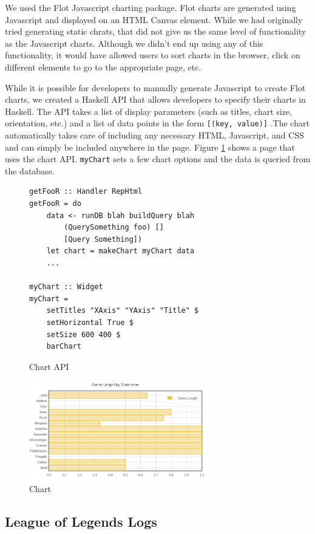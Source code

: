 \documentclass[letterpaper,twocolumn,9pt]{article}
\newcommand{\code}[1]{\texttt{#1}}
\begin{document}
We used the Flot Javascript charting package. Flot charts are generated using Javascript and displayed on an HTML Canvas element. While we had originally tried generating static chrats, that did not give us the same level of functionality as the Javascript charts. Although we didn't end up using any of this functionality, it would have allowed users to sort charts in the browser, click on different elements to go to the appropriate page, etc. 

While it is possible for developers to manually generate Javascript to create Flot charts, we created a Haskell API that allows developers to specify their charts in Haskell. The API takes a list of display parameters (such as titles, chart size, orientation, etc.) and a list of data points in the form \code{[(key, value)]} .The chart automatically takes care of including any necessary HTML, Javascript, and CSS and can simply be included anywhere in the page. Figure \ref{chartcode} shows a page that uses the chart API. \code{myChart} sets a few chart options and the data is queried from the database. 

\begin{figure}[]
\begin{verbatim}
getFooR :: Handler RepHtml
getFooR = do
    data <- runDB blah buildQuery blah
        (QuerySomething foo) []
        [Query Something])
    let chart = makeChart myChart data
    ...

myChart :: Widget
myChart = 
    setTitles "XAxis" "YAxis" "Title" $
    setHorizontal True $
    setSize 600 400 $
    barChart
\end{verbatim}
    \caption{Chart API}
    \label{chartcode}
\end{figure}

\begin{figure}[h]
    \includegraphics[width=80mm]{imgs/chart.png}
    \caption{Chart}
    \label{chart}
\end{figure}

\subsection{League of Legends Logs}
\end{document}
